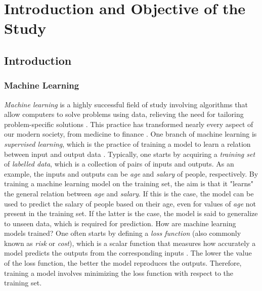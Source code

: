 \chapter{Introduction and Objective of the Study}

\section{Introduction}\label{sec:Introduction}

\subsection{Machine Learning}\label{sec:Machine Learning Intro}


\emph{Machine learning} is a highly successful field of study involving algorithms that allow computers to solve problems using data, relieving the need for tailoring problem-specific solutions \cite{SupervisedwquantumComputers}. This practice has transformed nearly every aspect of our modern society, from medicine \cite{medicine} to finance \cite{finance}. One branch of machine learning is \emph{supervised learning}, which is the practice of training a model to learn a relation between input and output data \cite{hastie01statisticallearning}. Typically, one starts by acquiring a \emph{training set} of \emph{labelled data}, which is a collection of pairs of inputs and outputs. As an example, the inputs and outputs can be \emph{age} and \emph{salary} of people, respectively. By training a machine learning model on the training set, the aim is that it "learns" the general relation between \emph{age} and \emph{salary}. If this is the case, the model can be used to predict the salary of people based on their age, even for values of \emph{age} not present in the training set. If the latter is the case, the model is said to generalize to unseen data, which is required for prediction. How are machine learning models trained? One often starts by defining a \emph{loss function} (also commonly known as \emph{risk} or  \emph{cost}), which is a scalar function that measures how accurately a model predicts the outputs from the corresponding inputs \cite{hastie01statisticallearning}. The lower the value of the loss function, the better the model reproduces the outputs. Therefore, training a model involves minimizing the loss function with respect to the training set.

